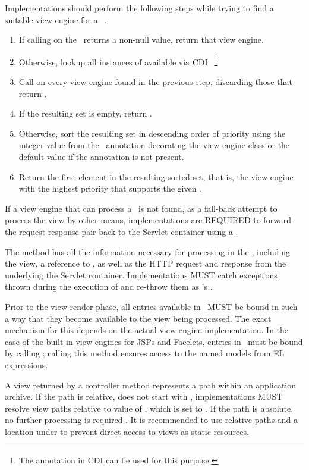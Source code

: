Implementations should perform the following steps while trying to find
a suitable view engine for a \Viewable\ .

\begin{enumerate}
\item If calling  on the \Viewable\ returns a non-null value, return
that view engine.
\item Otherwise, lookup all instances of  available via 
CDI.~\footnote{The  annotation in CDI can be used for this purpose.}
\item Call  on every view engine found in the previous step, discarding
those that return .
\item If the resulting set is empty, return .
\item Otherwise, sort the resulting set in descending order of priority using the integer value 
from the \Priority\ annotation decorating the view engine class or the default value
  if the annotation is not present.
\item Return the first element in the resulting sorted set, that is, the view engine with
the highest priority that supports the given \Viewable.
\end{enumerate}

If a view engine that can process a \Viewable\ is not found, as a fall-back attempt to 
process the view by other means, implementations are 
REQUIRED to forward the request-response pair back to the Servlet container using a 
 .

The  method has all the information necessary for processing
in the ,
including the view, a reference to \Models, as well as the HTTP request and response
 from the underlying the Servlet container. Implementations MUST catch
exceptions thrown during the execution of  and re-throw them as 
's .

Prior to the view render phase, all entries available in \Models\ MUST be bound in
such a way that they become available to the view being processed. The exact mechanism
for this depends on the actual view engine implementation. In the case of the built-in
view engines for JSPs and Facelets, entries in \Models\ must be bound by calling
; calling this method ensures
access to the named models from EL expressions.

A view returned by a controller method represents a path within an
application archive. If the path is relative, does not start with , implementations 
MUST resolve view paths relative to value of , 
which is set to . If the path is absolute, no further processing
is required . It is recommended to use relative paths and a 
location under  to prevent direct access to views as static resources.


